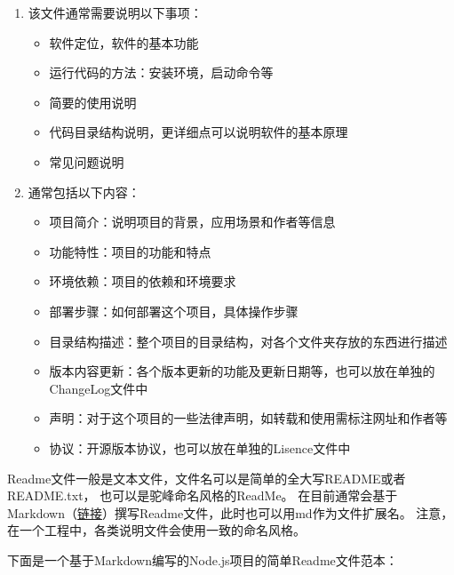 \begin{enumerate}
  \item 该文件通常需要说明以下事项：
        \begin{itemize}
          \item 软件定位，软件的基本功能
          \item 运行代码的方法：安装环境，启动命令等
          \item 简要的使用说明
          \item 代码目录结构说明，更详细点可以说明软件的基本原理
          \item 常见问题说明
        \end{itemize}
  \item 通常包括以下内容：
        \begin{itemize}
          \item 项目简介：说明项目的背景，应用场景和作者等信息
          \item 功能特性：项目的功能和特点
          \item 环境依赖：项目的依赖和环境要求
          \item 部署步骤：如何部署这个项目，具体操作步骤
          \item 目录结构描述：整个项目的目录结构，对各个文件夹存放的东西进行描述
          \item 版本内容更新：各个版本更新的功能及更新日期等，也可以放在单独的ChangeLog文件中
          \item 声明：对于这个项目的一些法律声明，如转载和使用需标注网址和作者等
          \item 协议：开源版本协议，也可以放在单独的Lisence文件中
        \end{itemize}
\end{enumerate}

Readme文件一般是文本文件，文件名可以是简单的全大写README或者README.txt，
也可以是驼峰命名风格的ReadMe。
在目前通常会基于Markdown（\href{https://www.jianshu.com/p/q81RER}
{链接}）撰写Readme文件，此时也可以用md作为文件扩展名。
注意，在一个工程中，各类说明文件会使用一致的命名风格。

下面是一个基于Markdown编写的Node.js项目的简单Readme文件范本：

